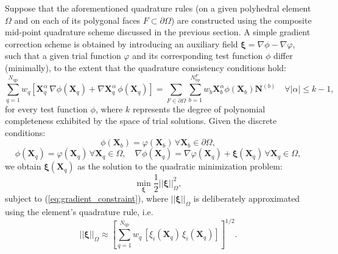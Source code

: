 	Suppose that the aforementioned quadrature rules (on a given polyhedral element $\Omega$ and on each of its polygonal faces $F \subset \partial \Omega$) are constructed using the composite mid-point quadrature scheme discussed in the previous section. A simple gradient correction scheme is obtained by introducing an auxiliary field $\boldsymbol{\xi} = \nabla \phi - \nabla \varphi$, such that a given trial function $\varphi$ and its corresponding test function $\phi$ differ (minimally), to the extent that the quadrature consistency conditions hold:
    \begin{equation}
          \sum_{q=1}^{N_{\mathrm q\mathrm p}} w_q \left[ \bm{X}_q^{\alpha} \, \nabla \phi (\bm{X}_q) + \nabla \bm{X}^{\alpha}_{q} \, \phi (\bm{X}_q) \right] = \sum_{F \in \partial \Omega} \sum_{b=1}^{N^F_{\mathrm b\mathrm p}} w_b \bm{X}_b^{\alpha} \phi (\bm{X}_b) \bm{N}^{(b)} \quad \forall | \alpha | \leq k-1,
          \label{eq:gradient_constraint}
    \end{equation}
    for every test function $\phi$, where $k$ represents the degree of polynomial completeness exhibited by the space of trial solutions. Given the discrete conditions:
    \begin{equation}
		\phi(\bm{X}_b) = \varphi(\bm{X}_b) \, \forall \bm{X}_b \in \partial \Omega, 
	\end{equation}
	\begin{equation}
		\phi(\bm{X}_q) = \varphi(\bm{X}_q) \, \forall \bm{X}_q \in \Omega, \quad \nabla \phi(\bm{X}_q) = \nabla \varphi (\bm{X}_q) + \boldsymbol{\xi} (\bm{X}_q) \, \forall \bm{X}_q \in \Omega,
    	\end{equation}
    	we obtain $\boldsymbol{\xi} (\bm{X}_q)$ as the solution to the quadratic minimization problem:
    	\begin{equation}
    		\min_{\boldsymbol{\xi}} \frac{1}{2} || \boldsymbol{\xi} ||^2_{\Omega},
    	\end{equation}
    	subject to (\ref{eq:gradient_constraint}), where $|| \boldsymbol{\xi} ||_{\Omega}$ is deliberately approximated using the element's quadrature rule, i.e.
    	\begin{equation}
    		|| \boldsymbol{\xi} ||_{\Omega} \approx \left[ \sum_{q=1}^{N_{\mathrm q\mathrm p}} w_q \, \left[ \xi_i (\bm{X}_q) \, \xi_i (\bm{X}_q) \right] \right]^{1/2}.
    	\end{equation}
    	
